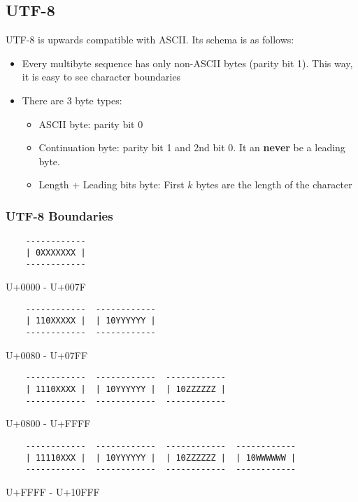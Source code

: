\documentclass[13pt]{article}
\begin{document}
\subsection{UTF-8}
UTF-8 is upwards compatible with ASCII. Its schema is as follows:
\begin{itemize}[label=]
\item Every multibyte sequence has only non-ASCII bytes (parity bit 1). This way, it is easy to see character boundaries
\item There are 3 byte types:
  \begin{itemize}[label=]
  \item ASCII byte: parity bit 0
  \item Continuation byte: parity bit 1 and 2nd bit 0. It an \textbf{never} be a leading byte.
  \item Length + Leading bits byte: First $k$ bytes are the length of the character
  \end{itemize}
\end{itemize}

\subsubsection*{UTF-8 Boundaries}
\begin{verbatim}
    ------------
    | 0XXXXXXX |
    ------------
\end{verbatim}
U+0000 - U+007F
\begin{verbatim}
    ------------  ------------
    | 110XXXXX |  | 10YYYYYY |
    ------------  ------------
\end{verbatim}
U+0080 - U+07FF
\begin{verbatim}
    ------------  ------------  ------------
    | 1110XXXX |  | 10YYYYYY |  | 10ZZZZZZ |
    ------------  ------------  ------------
\end{verbatim}
U+0800 - U+FFFF
\begin{verbatim}
    ------------  ------------  ------------  ------------
    | 11110XXX |  | 10YYYYYY |  | 10ZZZZZZ |  | 10WWWWWW |
    ------------  ------------  ------------  ------------
\end{verbatim}
U+FFFF - U+10FFF
\end{document}
